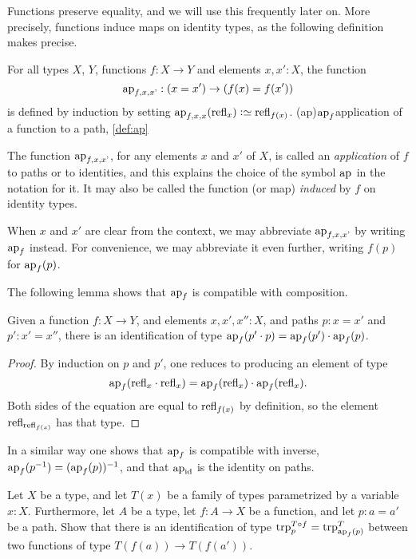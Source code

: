 Functions preserve equality, and we will use this frequently later on.  More precisely, functions induce maps on identity types, as the
following definition makes precise.

\begin{definition}\label{def:ap}
For all types $X$, $Y$, functions $f:X\to Y$ and elements $x,x':X$, the function
$$\ap{f,x,x'} : (x = x') \to (f(x) = f(x'))$$ is defined by induction by setting
$\ap{f,x,x}(\refl{x})\defeq\refl{f(x)}$.%
\glossary(ap){$\protect\ap{f}$}{application of a function to a path, \cref{def:ap}}
\end{definition}

The function $\ap{f,x,x'}$, for any elements $x$ and $x'$ of $X$, is called an \emph{application} of $f$ to paths or to identities,
and this explains the choice of the symbol $\ap{}$ in the notation for it.
It may also be called the function (or map) \emph{induced} by $f$ on identity types.

When $x$ and $x'$ are clear from the context, we may abbreviate $\ap{f,x,x'}$ by writing $\ap{f}$ instead.
For convenience, we may abbreviate it even further, writing $f(p)$ for $\ap f (p)$.

The following lemma shows that $\ap f$ is compatible with composition.

\begin{lemma}\label{lem:apcomp}
  Given a function $f:X\to Y$, and elements $x,x',x'':X$, and paths $p : x = x'$ and $p' : x' = x''$,
  there is an identification of type $\ap f (p' \cdot p) =  \ap f (p') \cdot  \ap f (p)$.
\end{lemma}

\begin{proof}
  By induction on $p$ and $p'$, one reduces to producing an element of type
  \[
    \ap f (\refl x \cdot \refl x) =  \ap f ( \refl x ) \cdot  \ap f ( \refl x ).
  \]
  Both sides of the equation are equal to $\mathrm{refl}_{ f(x) }$ by definition, so the element $\mathrm{refl}_{\mathrm{refl}_{ f(x) }}$
  has that type.
\end{proof}

In a similar way one shows that $\ap f$ is compatible with inverse,
$\ap f(p^{-1}) =  (\ap f (p))^{-1}$, and that $\ap \id$ is the identity on paths.


\begin{xca}\label{xca:trp-ap}
  Let $X$ be a type, and let $T(x)$ be a family of types parametrized by a variable $x:X$. Furthermore, let $A$ be a type, let $f:A\to X$ be a
  function, and let $p: a=a'$ be a path. Show that there is an identification of type $\trp[T \circ f]{p} = \trp[T]{\ap{f}(p)}$
  between two functions of type $T(f(a)) \to T(f(a'))$.
\end{xca}

